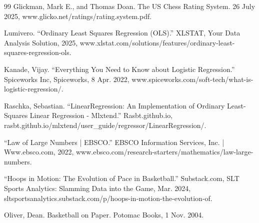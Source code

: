 \documentclass[12pt,leqno]{article}\usepackage[pdftex]{graphicx}\usepackage[usenames,dvipsnames]{xcolor}
\theoremstyle{remark}
\begin{document}
\begin{thebibliography}{99}
 Glickman, Mark  E., and Thomas Doan. The US Chess Rating System. 26 July 2025, www.glicko.net/ratings/rating.system.pdf.

 Lumivero. “Ordinary Least Squares Regression (OLS).” XLSTAT, Your Data Analysis Solution, 2025, www.xlstat.com/solutions/features/ordinary-least-squares-regression-ols.

 Kanade, Vijay. “Everything You Need to Know about Logistic Regression.” Spiceworks Inc, Spiceworks, 8 Apr. 2022, www.spiceworks.com/soft-tech/what-is-logistic-regression/.

 Raschka, Sebastian. “LinearRegression: An Implementation of Ordinary Least-Squares Linear Regression - Mlxtend.” Rasbt.github.io, rasbt.github.io/mlxtend/user\_guide/regressor/LinearRegression/.

 “Law of Large Numbers | EBSCO.” EBSCO Information Services, Inc. | Www.ebsco.com, 2022, www.ebsco.com/research-starters/mathematics/law-large-numbers.

 “Hoops in Motion: The Evolution of Pace in Basketball.” Substack.com, SLT Sports Analytics: Slamming Data into the Game, Mar. 2024, sltsportsanalytics.substack.com/p/hoops-in-motion-the-evolution-of.

 Oliver, Dean. Basketball on Paper. Potomac Books, 1 Nov. 2004.
 

\end{thebibliography}
\end{document}
